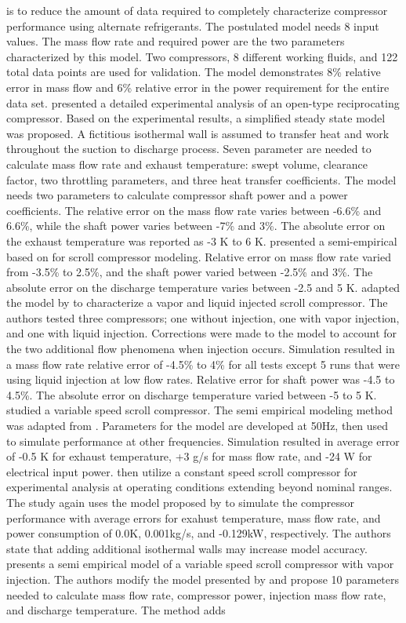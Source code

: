 \documentclass[preprint,11pt,authoryear]{elsarticle}
\begin{document}
is to reduce the amount of data required to completely characterize compressor performance using alternate refrigerants. The postulated model needs 8 input values. The mass flow rate and required power are the two parameters characterized by this model. Two compressors, 8 different working fluids, and 122 total data points are used for validation. The model demonstrates 8\% relative error in mass flow and 6\% relative error in the power requirement for the entire data set. \cite{Winandy_recip} presented a detailed experimental analysis of an open-type reciprocating compressor. Based on the experimental results, a simplified steady state model was proposed. A fictitious isothermal wall is assumed to transfer heat and work throughout the suction to discharge process. Seven parameter are needed to calculate mass flow rate and exhaust temperature: swept volume, clearance factor, two throttling parameters, and three heat transfer coefficients. The model needs two parameters to calculate compressor shaft power and a power coefficients. The relative error on the mass flow rate varies between -6.6\% and 6.6\%, while the shaft power varies between -7\% and 3\%. The absolute error on the exhaust temperature was reported as -3 K to 6 K. \cite{Winandy_scr} presented a semi-empirical based on \cite{Winandy_recip} for scroll compressor modeling. Relative error on mass flow rate varied from -3.5\% to 2.5\%, and the shaft power varied between -2.5\% and 3\%. The absolute error on the discharge temperature varies between -2.5 and 5 K. \cite{Winandy_inj} adapted the model by \cite{Winandy_scr} to characterize a vapor and liquid injected scroll compressor. The authors tested three compressors; one without injection, one with vapor injection, and one with liquid injection. Corrections were made to the model to account for the two additional flow phenomena when injection occurs. Simulation resulted in a mass flow rate relative error of -4.5\% to 4\% for all tests except 5 runs that were using liquid injection at low flow rates. Relative error for shaft power was -4.5 to 4.5\%. The absolute error on discharge temperature varied between -5 to 5 K. \cite{Cuevas2009} studied a variable speed scroll compressor. The semi empirical modeling method was adapted from \cite{Winandy_recip}. Parameters for the model are developed at 50Hz, then used to simulate performance at other frequencies. Simulation resulted in average error of -0.5 K for exhaust temperature, +3 g/s for mass flow rate, and -24 W for electrical input power. \cite{Cuevas2010} then utilize a constant speed scroll compressor for experimental analysis at operating conditions extending beyond nominal ranges. The study again uses the model proposed by \cite{Winandy_recip} to simulate the compressor performance with average errors for exahust temperature, mass flow rate, and power consumption of 0.0K, 0.001kg/s, and -0.129kW, respectively. The authors state that adding additional isothermal walls may increase model accuracy. \cite{Dardenne2015} presents a semi empirical model of a variable speed scroll compressor with vapor injection. The authors modify the model presented by \cite{Winandy_recip} and propose 10 parameters needed to calculate mass flow rate, compressor power, injection mass flow rate, and discharge temperature. The method adds 
\end{document}
